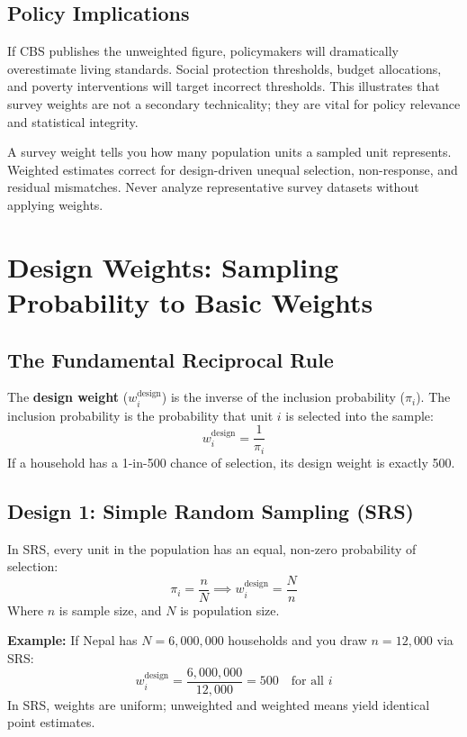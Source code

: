 \documentclass[11pt,a4paper]{article}
\newenvironment{example}
  {\par\vspace{0.5em}\noindent\textbf{\color{primary}Example:}\space}
  {\par\vspace{0.5em}}
\begin{document}
\subsection{Policy Implications}
If CBS publishes the unweighted figure, policymakers will dramatically overestimate living standards. Social protection thresholds, budget allocations, and poverty interventions will target incorrect thresholds. This illustrates that survey weights are not a secondary technicality; they are vital for policy relevance and statistical integrity.

\begin{keytakeaway}
A survey weight tells you how many population units a sampled unit represents. Weighted estimates correct for design-driven unequal selection, non-response, and residual mismatches. Never analyze representative survey datasets without applying weights.
\end{keytakeaway}

\newpage

\section{Design Weights: Sampling Probability to Basic Weights}

\subsection{The Fundamental Reciprocal Rule}
The \textbf{design weight} ($w_i^{\text{design}}$) is the inverse of the inclusion probability ($\pi_i$). The inclusion probability is the probability that unit $i$ is selected into the sample:
\begin{equation}
  w_i^{\text{design}} = \frac{1}{\pi_i}
\end{equation}
If a household has a 1-in-500 chance of selection, its design weight is exactly 500.

\subsection{Design 1: Simple Random Sampling (SRS)}
In SRS, every unit in the population has an equal, non-zero probability of selection:
\begin{equation}
  \pi_i = \frac{n}{N} \implies w_i^{\text{design}} = \frac{N}{n}
\end{equation}
Where $n$ is sample size, and $N$ is population size.
\begin{example}
  If Nepal has $N = 6,000,000$ households and you draw $n = 12,000$ via SRS:
  \[
    w_i^{\text{design}} = \frac{6,000,000}{12,000} = 500 \quad \text{for all } i
  \]
  In SRS, weights are uniform; unweighted and weighted means yield identical point estimates.
\end{example}
\end{document}
